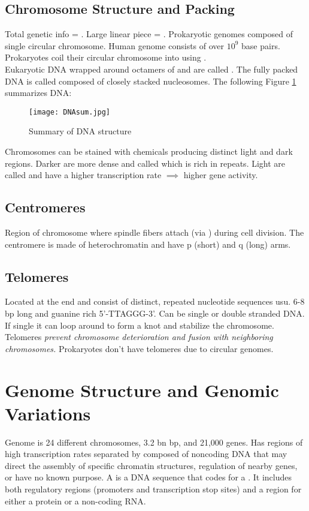 \documentclass[../Bio_chemistryReview.tex]{subfiles}
\begin{document}
\subsection{Chromosome Structure and Packing}
Total genetic info = . Large linear piece = .
Prokaryotic genomes composed of single circular chromosome. Human genome
consists of over $ 10^{9} $ base pairs. Prokaryotes coil their circular
chromosome into  using .\\
Eukaryotic DNA wrapped around octamers of  and are called
. The fully packed DNA is called  composed
of closely stacked nucleosomes. The following Figure \ref{fig:sumDNA} summarizes
DNA:
\begin{figure}[h]
  \centering
  \texttt{[image: DNAsum.jpg]}
  \caption{Summary of DNA structure}
  \label{fig:sumDNA}
\end{figure}
Chromosomes can be stained with chemicals producing distinct light and dark
regions. Darker are more dense and called  which is rich
in repeats. Light are called  and have a higher
transcription rate $ \implies $ higher gene activity.

\subsection{Centromeres}
Region of chromosome where spindle fibers attach (via )
during cell division. The centromere is made of heterochromatin and have p
(short) and q (long) arms.

\subsection{Telomeres}
Located at the end and consist of distinct, repeated nucleotide sequences usu.
6-8 bp long and guanine rich 5'-TTAGGG-3'. Can be single or double stranded DNA.
If single it can loop around to form a knot and stabilize the chromosome.
Telomeres \emph{prevent chromosome deterioration and fusion with neighboring
chromosomes.} Prokaryotes don't have telomeres due to circular genomes.

\section{Genome Structure and Genomic Variations}
Genome is 24 different chromosomes, 3.2 bn bp, and 21,000 genes. Has regions of
high transcription rates separated by  composed of
noncoding DNA that may direct the assembly of specific chromatin structures,
regulation of nearby genes, or have no known purpose. A  is a DNA
sequence that codes for a . It includes both regulatory
regions (promoters and transcription stop sites) and a region for either a
protein or a non-coding RNA.
\end{document}
